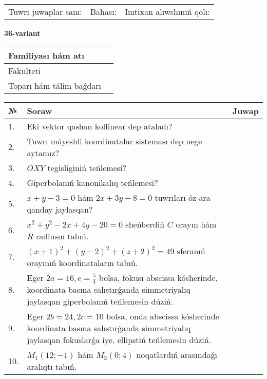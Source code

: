 \documentclass{article}
\begin{document}
\vspace{1cm}

\begin{tabular}{lll}
Tuwrı juwaplar sanı: \underline{\hspace{1.5cm}} & 
Bahası: \underline{\hspace{1.5cm}} & 
Imtixan alıwshınıń qolı: \underline{\hspace{2cm}} \\
\end{tabular}

\egroup

\newpage


\textbf{36-variant}\\

\bgroup
\def\arraystretch{1.6} %

\begin{tabular}{|m{5.7cm}|m{9.5cm}|}
\hline
Familiyası hám atı & \\
\hline
Fakulteti  & \\
\hline
Toparı hám tálim baǵdarı  & \\
\hline
\end{tabular}

\vspace{1cm}

\begin{tabular}{|m{0.7cm}|m{10cm}|m{4cm}|}
\hline
№ & Soraw & Juwap \\
\hline
1. & Eki vektor qashan kollinear dep ataladı? &  \\
\hline
2. & Tuwrı múyeshli koordinatalar sisteması dep nege aytamız? &  \\
\hline
3. & $OXY$ tegisliginiń teńlemesi? &  \\
\hline
4. & Giperbolanıń kanonikalıq teńlemesi? &  \\
\hline
5. & $x+y-3=0$ hám $2x+3y-8=0$ tuwrıları óz-ara qanday jaylasqan? &  \\
\hline
6. & $x^{2}+y^{2}-2x+4y-20=0$ sheńberdiń $C$ orayın hám $R$ radiusın tabıń. &  \\
\hline
7. & $(x+1)^{2}+(y-2) ^{2}+(z+2) ^{2}=49$ sferanıń orayınıń koordinataların tabıń. &  \\
\hline
8. & Eger $2a=16, e=\frac{5}{4}$ bolsa, fokusı abscissa kósherinde, koordinata basına salıstırǵanda simmetriyalıq jaylasqan giperbolanıń teńlemesin dúziń. &  \\
\hline
9. & Eger $2b=24, 2 c=10$ bolsa, onda abscissa kósherinde koordinata basına salıstırǵanda simmetriyalıq jaylasqan fokuslarǵa iye, ellipstiń teńlemesin dúziń. &  \\
\hline
10. & $M_{1} (12;-1)$ hám $M_{2} (0;4)$ noqatlardıń arasındaǵı aralıqtı tabıń. &  \\
\hline
\end{tabular}
\end{document}
